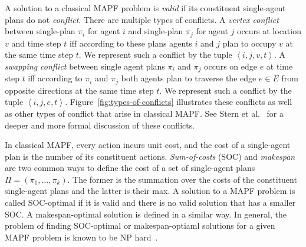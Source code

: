 \documentclass[review]{elsarticle}
\newcommand{\tuple}[1]{\ensuremath{\left \langle #1 \right \rangle }}
\newcommand\konstantin[1]{\nb{\textbf{Konstantin:}}{red}{#1}}
\newcommand\roni[1]{\nb{\textbf{Roni:}}{green}{#1}}
\newcommand\dor[1]{\nb{\textbf{Dor:}}{Fuchsia}{#1}}
\newcommand{\mapf}{\ac{MAPF}\xspace}
\begin{document}
A solution to a classical MAPF problem is \emph{valid} if its constituent single-agent plans do not \emph{conflict}. 
There are multiple types of conflicts. 
A \emph{vertex conflict} between single-plan $\pi_i$ for agent $i$ 
and single-plan $\pi_j$ for agent $j$ occurs at location $v$ and time step $t$ iff according to these plans agents $i$ and $j$ plan to occupy $v$ at the same time step $t$. We represent such a conflict by the tuple $\tuple{i,j,v,t}$. 
A \emph{swapping conflict} between single agent plans $\pi_i$ and $\pi_j$ occurs on edge $e$ at time step $t$ iff according to $\pi_i$ and $\pi_j$ both agents plan to traverse the edge $e\in E$ from opposite directions at the same time step $t$. We represent such a conflict by the tuple $\tuple{i,j,e,t}$. 
Figure~\ref{fig:types-of-conflicts} illustrates these conflicts as well as other types of conflict that arise in classical MAPF. See Stern et al.~\cite{stern2019mapf} for a deeper and more formal discussion of these conflicts. 


In classical MAPF, every action incurs unit cost, 
and the cost of a single-agent plan is the number of its constituent actions. 
\emph{Sum-of-costs} (SOC) and \emph{makespan} are two common ways to define the cost of a set of single-agent plans $\Pi=(\pi_1,\ldots, \pi_k)$. The former is the summation over the costs of the constituent single-agent plans and the latter is their max. A solution to a \mapf problem is called SOC-optimal if it is valid and there is no valid solution that has a smaller SOC. A makespan-optimal solution is defined in a similar way. 
In general, the problem of finding SOC-optimal or makespan-optiaml solutions for a given \mapf problem is known to be NP hard~\cite{yu2013multi,surynek2010optimization}.

\end{document}
